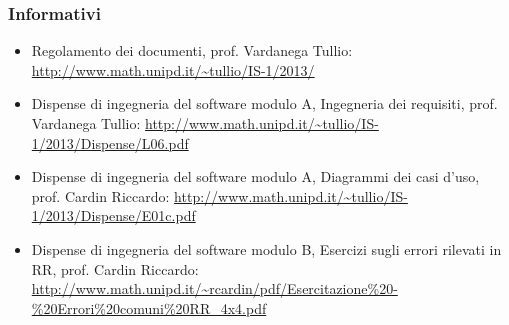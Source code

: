 \subsubsection{Informativi}
\begin{itemize}
\item Regolamento dei documenti, prof. Vardanega Tullio: \url{http://www.math.unipd.it/~tullio/IS-1/2013/}
\item Dispense di ingegneria del software modulo A, Ingegneria dei requisiti, prof. Vardanega Tullio:
\url{http://www.math.unipd.it/~tullio/IS-1/2013/Dispense/L06.pdf}
\item Dispense di ingegneria del software modulo A, Diagrammi dei casi d'uso, prof. Cardin Riccardo:
\url{http://www.math.unipd.it/~tullio/IS-1/2013/Dispense/E01c.pdf}
\item Dispense di ingegneria del software modulo B, Esercizi sugli errori rilevati in RR, prof. Cardin Riccardo:
\url{http://www.math.unipd.it/~rcardin/pdf/Esercitazione%20-%20Errori%20comuni%20RR_4x4.pdf}
\end{itemize}